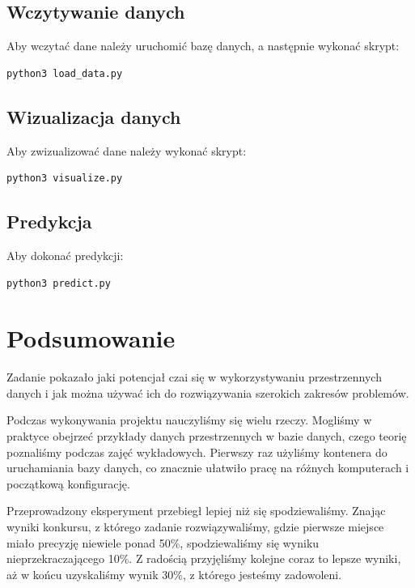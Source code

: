\documentclass[a4paper,12pt]{mwart}
\begin{document}
\subsection{Wczytywanie danych}
Aby wczytać dane należy uruchomić bazę danych, a następnie wykonać skrypt:
\begin{lstlisting}
python3 load_data.py
\end{lstlisting}

\subsection{Wizualizacja danych}
Aby zwizualizować dane należy wykonać skrypt:
\begin{lstlisting}
python3 visualize.py
\end{lstlisting}

\subsection{Predykcja}
Aby dokonać predykcji:
\begin{lstlisting}
python3 predict.py
\end{lstlisting}

\section{Podsumowanie}
Zadanie pokazało jaki potencjał czai się w wykorzystywaniu przestrzennych danych i jak można używać ich do rozwiązywania szerokich zakresów problemów.

Podczas wykonywania projektu nauczyliśmy się wielu rzeczy. Mogliśmy w praktyce obejrzeć przykłady danych przestrzennych w bazie danych, czego teorię poznaliśmy podczas zajęć wykładowych. Pierwszy raz użyliśmy kontenera do uruchamiania bazy danych, co znacznie ułatwiło pracę na różnych komputerach i początkową konfigurację.

Przeprowadzony eksperyment przebiegł lepiej niż się spodziewaliśmy. Znając wyniki konkursu, z którego zadanie rozwiązywaliśmy, gdzie pierwsze miejsce miało precyzję niewiele ponad 50\%, spodziewaliśmy się wyniku nieprzekraczającego 10\%. Z radością przyjęliśmy kolejne coraz to lepsze wyniki, aż w końcu uzyskaliśmy wynik 30\%, z którego jesteśmy zadowoleni.
\end{document}
